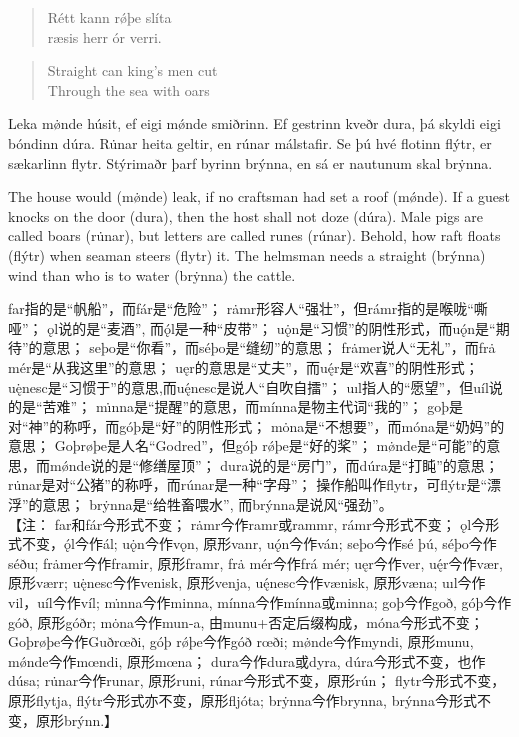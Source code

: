 \begin{paracol}{2}
  \switchcolumn*

  \begin{quote}
    Rétt kann rǿþe slíta\\
    ræsis herr ór verri.\\
  \end{quote}

  \switchcolumn

  \begin{quote}
    Straight can king's men cut\\
    Through the sea with oars \\
  \end{quote}

  \switchcolumn*
  Leka mø̇nde húsit, ef eigi mǿnde smiðrinn. Ef gestrinn kveðr dura, þá skyldi eigi bóndinn dúra. Ru̇nar heita geltir, en rúnar málstafir. Se þú hvé flotinn flýtr, er sækarlinn flytr. Stýrimaðr þarf byrinn brýnna, en sá er nautunum skal brẏnna.

  \switchcolumn
  The house would (mø̇nde) leak, if no craftsman had set a roof (mǿnde). If a guest knocks on the door (dura), then the host shall not doze (dúra). Male pigs are called boars (ru̇nar), but letters are called runes (rúnar). Behold, how raft floats (flýtr) when seaman steers (flytr) it. The helmsman needs a straight (brýnna) wind than who is to water (brẏnna) the cattle.
\end{paracol}
\begin{translation*}{}
  far指的是“帆船”，而fár是“危险”；
  r\.{a}mr形容人“强壮”，但rámr指的是喉咙“嘶哑”；
  ǫl说的是“麦酒”, 而ǫ́l是一种“皮带”；
  u\.{ǫ}n是“习惯”的阴性形式，而uǫ́n是“期待”的意思；
  seþo是“你看”，而séþo是“缝纫”的意思；
  fr\.{a}mer说人“无礼”，而frȧ mér是“从我这里”的意思；
  uęr的意思是“丈夫”，而uę́r是“欢喜”的阴性形式；
  u\.{ę}nesc是“习惯于”的意思,而uę́nesc是说人“自吹自擂”；
  uıl指人的“愿望”，但uíl说的是“苦难”；
  m\.{ı}nna是“提醒”的意思，而mínna是物主代词“我的”；
  goþ是对“神”的称呼，而góþ是“好”的阴性形式；
  mȯna是“不想要”，而móna是“奶妈”的意思；
  Goþrøþe是人名“Godred”，但góþ rǿþe是“好的桨”；
  m\.{ø}nde是“可能”的意思，而mǿnde说的是“修缮屋顶”；
  dura说的是“房门”，而dúra是“打盹”的意思；
  r\.{u}nar是对“公猪”的称呼，而rúnar是一种“字母”；
  操作船叫作flytr，可flýtr是“漂浮”的意思；
  br\.{y}nna是“给牲畜喂水”, 而brýnna是说风“强劲”。\\

  【注：
  far和fár今形式不变；
  r\.{a}mr今作ramr或rammr, rámr今形式不变；
  ǫl今形式不变，ǫ́l今作ál;
  u\.{ǫ}n今作vǫn, 原形vanr, u\'{ǫ}n今作ván; seþo今作sé þú, séþo今作séðu;
  fr\.{a}mer今作framir, 原形framr, frȧ mér今作frá mér;
  uęr今作ver, u\'{ę}r今作vær, 原形værr;
  u\.{ę}nesc今作venisk, 原形venja, u\'{ę}nesc今作vænisk, 原形væna;
  uıl今作vil，uíl今作víl;
  m\.{ı}nna今作minna, mínna今作mínna或minna;
  goþ今作goð, góþ今作góð, 原形góðr;
  mȯna今作mun-a, 由munu+否定后缀构成，móna今形式不变；
  Goþrøþe今作Guðrœði, góþ rǿþe今作góð rœði;
  m\.{ø}nde今作myndi, 原形munu, mǿnde今作mœndi, 原形mœna；
  dura今作dura或dyra, dúra今形式不变，也作dúsa;
  r\.{u}nar今作runar, 原形runi, rúnar今形式不变，原形rún；
  flytr今形式不变，原形flytja, flýtr今形式亦不变，原形fljóta;
  br\.{y}nna今作brynna, brýnna今形式不变，原形brýnn.】
\end{translation*}
